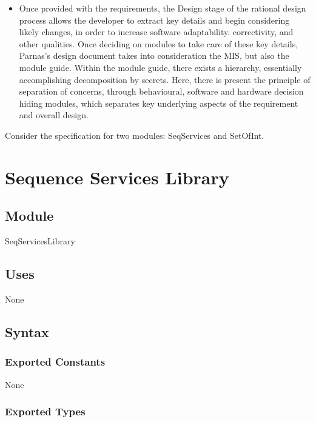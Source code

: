 \documentclass[12pt,fleqn]{examtst}
\begin{document}
\begin{enumerate}[a)]
\begin{itemize}
  \item Once provided with the requirements, the Design stage of the rational design process allows the developer to extract key details and begin considering likely changes, in order to increase software adaptability. correctivity, and other qualities. Once deciding on modules to take care of these key details, Parnas's design document takes into consideration the MIS, but also the module guide. Within the module guide, there exists a hierarchy, essentially accomplishing decomposition by secrets. Here, there is present the principle of separation of concerns, through behavioural, software and hardware decision hiding modules, which separates key underlying aspects of the requirement and overall design.
  \end{itemize}
\end{enumerate}


\newpage

\noindent Consider the specification for two modules: SeqServices and SetOfInt.

\section* {Sequence Services Library}

\subsection*{Module}

SeqServicesLibrary

\subsection* {Uses}

None

\subsection* {Syntax}

\subsubsection* {Exported Constants}

None

\subsubsection* {Exported Types}
\end{document}
